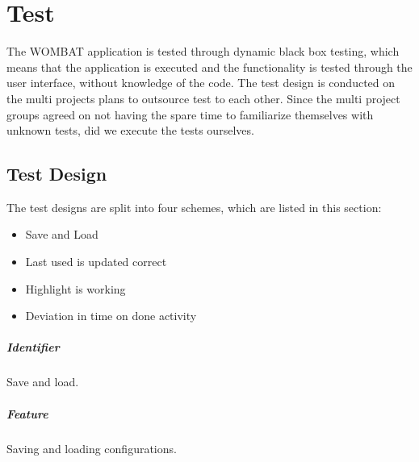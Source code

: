 \chapter{Test}
\label{cha:test}
The WOMBAT application is tested through dynamic black box testing, which means that the application is executed and the functionality is tested through the user interface, without knowledge of the code. 
The test design is conducted on the multi projects plans to outsource test to each other. 
Since the multi project groups agreed on not having the spare time to familiarize themselves with unknown tests, did we execute the tests ourselves.

\section{Test Design}
\label{sec:test_design}
The test designs are split into four schemes, which are listed in this section:
\begin{itemize}
	\item Save and Load
	\item Last used is updated correct
	\item Highlight is working
	\item Deviation in time on done activity
\end{itemize}

\clearpage
\paragraph{Identifier}
	Save and load.
\paragraph{Feature}
	Saving and loading configurations.
